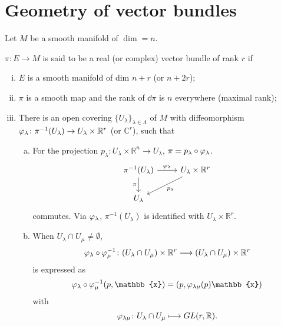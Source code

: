 \documentclass[12pt]{article}
\begin{document}
\section{Geometry of vector bundles}
Let \(M\) be a smooth manifold of \(\dim=n\).
\begin{definition}
    \(\pi\colon E\to M\) is said to be a real (or complex) vector bundle of rank \(r\)
    if
    \begin{enumerate}[(i)]
    \item \(E\) is a smooth manifold of dim \(n+r\) (or \(n+2r\));
    \item \(\pi\) is a smooth map and the rank of \(\dd{\pi}\) is \(n\) everywhere
        (maximal rank);
    \item There is an open covering \(\{U_\lambda\}_{\lambda\in \Lambda}\) of \(M\)
        with diffeomorphism \(\varphi_\lambda\colon \pi^{-1}(U_\lambda)\to U_\lambda
        \times \mathbb{R}^r\) (or \(\mathbb{C}^r\)), such that
        \begin{enumerate}[(a)]
        \item For the projection \(p_\lambda\colon U_\lambda\times \mathbb{R}^n\to 
            U_\lambda\), \(\pi=p_\lambda\circ \varphi_\lambda\). \ie\ 
            \[\begin{tikzcd}
                {\pi^{-1}(U_\lambda)} & {U_\lambda\times\mathbb{R}^r} \\
                {U_\lambda}
                \arrow["{\varphi_\lambda}", from=1-1, to=1-2]
                \arrow["\pi"', from=1-1, to=2-1]
                \arrow["{p_\lambda}", from=1-2, to=2-1]
            \end{tikzcd}\]
            commutes. Via \(\varphi_\lambda\), \(\pi^{-1}(U_\lambda)\) is identified with
            \(U_\lambda\times \mathbb{R}^r\).
        \item When \(U_\lambda\cap U_\mu\neq \emptyset\), \[
            \varphi_\lambda\circ \varphi_\mu^{-1}\colon (U_\lambda\cap U_\mu)\times
            \mathbb{R}^r\longrightarrow (U_\lambda\cap U_\mu)\times \mathbb{R}^r
        \] is expressed as \[
            \vphi_\lambda\circ \vphi_\mu^{-1}(p,\mathbb{x})=(p,\vphi_{\lambda\mu}(p)
            \mathbb{x})
        \] with \[
            \varphi_{\lambda\mu}\colon U_\lambda\cap U_\mu\longmapsto
            GL(r,\mathbb{R})
        .\] 
        \end{enumerate}
    \end{enumerate}
\end{definition}
\end{document}
